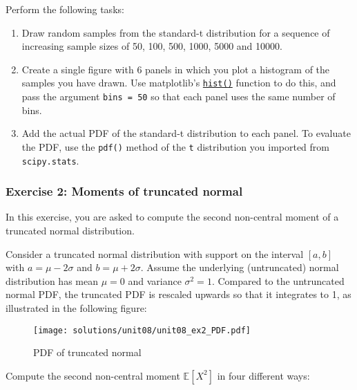 \documentclass{scrartcl}
\providecommand{\tightlist}{%
      \setlength{\itemsep}{0pt}\setlength{\parskip}{0pt}}
\begin{document}
Perform the following tasks:

\begin{enumerate}
\def\labelenumi{\arabic{enumi}.}
\tightlist
\item
  Draw random samples from the standard-t distribution for a sequence of
  increasing sample sizes of 50, 100, 500, 1000, 5000 and 10000.
\item
  Create a single figure with 6 panels in which you plot a histogram of
  the samples you have drawn. Use matplotlib's
  \href{https://matplotlib.org/api/_as_gen/matplotlib.pyplot.hist.html}{\texttt{hist()}}
  function to do this, and pass the argument \texttt{bins\ =\ 50} so
  that each panel uses the same number of bins.
\item
  Add the actual PDF of the standard-t distribution to each panel. To
  evaluate the PDF, use the \texttt{pdf()} method of the \texttt{t}
  distribution you imported from \texttt{scipy.stats}.
\end{enumerate}

    \hypertarget{exercise-2-moments-of-truncated-normal}{%
\subsubsection{Exercise 2: Moments of truncated
normal}\label{exercise-2-moments-of-truncated-normal}}

In this exercise, you are asked to compute the second non-central moment
of a truncated normal distribution.

Consider a truncated normal distribution with support on the interval
\([a,b]\) with \(a = \mu-2\sigma\) and \(b=\mu+2\sigma\). Assume the
underlying (untruncated) normal distribution has mean \(\mu = 0\) and
variance \(\sigma^2 = 1\). Compared to the untruncated normal PDF, the
truncated PDF is rescaled upwards so that it integrates to 1, as
illustrated in the following figure:

\begin{figure}
\centering
\texttt{[image: solutions/unit08/unit08\_ex2\_PDF.pdf]}
\caption{PDF of truncated normal}
\end{figure}

Compute the second non-central moment \(\mathbb{E}[X^2]\) in four
different ways:
\end{document}

